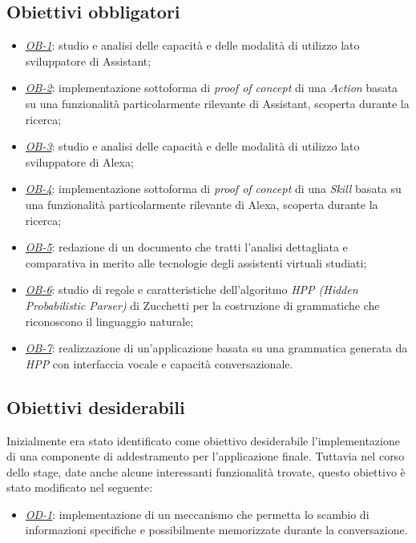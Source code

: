 	\subsection{Obiettivi obbligatori}
	\begin{itemize}
		\item \textit{\underline{OB-1}}: studio e analisi delle capacità e delle modalità di utilizzo lato sviluppatore di Assistant;
		\item \textit{\underline{OB-2}}: implementazione sottoforma di \textit{proof of concept} di una \textit{Action} basata su una funzionalità particolarmente rilevante di Assistant, scoperta durante la ricerca;
		\item \textit{\underline{OB-3}}: studio e analisi delle capacità e delle modalità di utilizzo lato sviluppatore di Alexa;
		\item \textit{\underline{OB-4}}: implementazione sottoforma di \textit{proof of concept} di una \textit{Skill} basata su una funzionalità particolarmente rilevante di Alexa, scoperta durante la ricerca;
		\item \textit{\underline{OB-5}}: redazione di un documento che tratti l'analisi dettagliata e comparativa in merito alle tecnologie degli assistenti virtuali studiati;
		\item \textit{\underline{OB-6}}: studio di regole e caratteristiche dell'algoritmo \textit{HPP (Hidden Probabilistic Parser)} di Zucchetti per la costruzione di grammatiche che riconoscono il linguaggio naturale;
		\item \textit{\underline{OB-7}}: realizzazione di un'applicazione basata su una grammatica generata da \textit{HPP} con interfaccia vocale e capacità conversazionale.
	\end{itemize}
	\subsection{Obiettivi desiderabili}
	Inizialmente era stato identificato come obiettivo desiderabile l'implementazione di una componente di addestramento per l'applicazione finale. Tuttavia nel corso dello stage, date anche alcune interessanti funzionalità trovate, questo obiettivo è stato modificato nel seguente:
	\begin{itemize}
		\item \textit{\underline{OD-1}}: implementazione di un meccanismo che permetta lo scambio di informazioni specifiche e possibilmente memorizzate durante la conversazione.
	\end{itemize}
